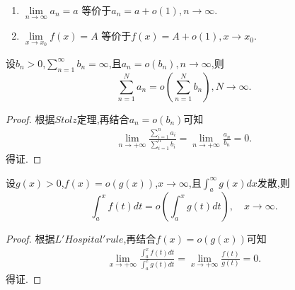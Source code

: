 \documentclass[lang=cn,newtx,10pt,scheme=chinese]{../Template/elegantbook}
\begin{document}
\begin{proposition}[极限的等价定义]\label{proposition:极限的等价定义(用o余项定义极限)}
\begin{enumerate}
\item $\underset{n\rightarrow \infty}{\lim}a_n=a$
等价于$a_n=a+o\left( 1 \right) ,n\rightarrow \infty$.

\item $\underset{x\rightarrow x_0}{\lim}f\left( x \right) =A$
等价于$f\left( x \right) =A+o\left( 1 \right) ,x\rightarrow x_0$.
\end{enumerate}

\end{proposition}

\begin{theorem}\label{theorem:发散级数的求和号与o可交换}
    设\(b_n>0\),\(\sum_{n = 1}^{\infty}b_n=\infty\),且\(a_n = o(b_n),n\to\infty\),则
\[
\sum_{n = 1}^{N}a_n=o\left(\sum_{n = 1}^{N}b_n\right),N\to\infty.
\]
\end{theorem}
\begin{proof}
    根据$Stolz$定理,再结合$a_n=o\left( b_n \right)$可知
    \begin{align*}
        \underset{n\rightarrow +\infty}{\lim}\frac{\sum\limits_{i=1}^n{a_i}}{\sum\limits_{i=1}^n{b_i}}=\underset{n\rightarrow +\infty}{\lim}\frac{a_n}{b_n}=0.
    \end{align*}得证.
\end{proof}

\begin{theorem}\label{theorem:发散积分的积分号与o可交换}
   设\(g(x)>0\),\(f(x)=o(g(x))\),\(x\to\infty\),且\(\int_{a}^{\infty}g(x)dx\)发散,则
\[
\int_{a}^{x}f(t)dt = o\left(\int_{a}^{x}g(t)dt\right),\quad x\to\infty.
\]
\end{theorem}
\begin{proof}
    根据$L'Hospital'rule$,再结合$f(x)=o(g(x))$可知
    \begin{align*}
        \underset{x\rightarrow +\infty}{\lim}\frac{\int_a^x{f\left( t \right) dt}}{\int_a^x{g\left( t \right) dt}}=\underset{x\rightarrow +\infty}{\lim}\frac{f\left( t \right)}{g\left( t \right)}=0.
    \end{align*}得证.
\end{proof}
\end{document}
